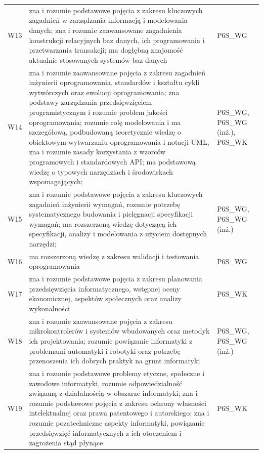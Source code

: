 \documentclass[12pt,a4paper]{article}
\begin{document}
{\begin{longtable}{m{1cm}m{9.5cm}m{3.9cm}}
\rowcolor{tableRowLight} W13 & zna i rozumie podstawowe pojęcia z zakresu kluczowych zagadnień w zarządzania informacją i modelowania danych; zna i rozumie zaawansowane zagadnienia konstrukcji relacyjnych baz danych, ich programowania i przetwarzania transakcji; ma dogłębną znajomość aktualnie stosowanych systemów baz danych & {\scriptsize P6S\_WG} \\
\rowcolor{tableRowAlt} W14 & zna i rozumie zaawansowane pojęcia z zakresu zagadnień inżynierii oprogramowania, standardów i kształtu cykli wytwórczych oraz ewolucji oprogramowania; zna podstawy zarządzania przedsięwzięciem programistycznym i rozumie problem jakości oprogramowania; rozumie rolę modelowania i ma szczegółową, podbudowaną teoretycznie wiedzę o obiektowym  wytwarzaniu oprogramowania i notacji UML, zna i rozumie zasady korzystania z wzorców programowych i standardowych API; ma podstawową wiedzę o typowych narzędziach i środowiskach wspomagających; & {\scriptsize P6S\_WG, P6S\_WG {\scriptsize (inż.)}, P6S\_WK} \\
\rowcolor{tableRowLight} W15 & zna i rozumie podstawowe pojęcia z zakresu kluczowych zagadnień inżynierii wymagań, rozumie potrzebę systematycznego budowania i pielęgnacji specyfikacji wymagań; ma rozszerzoną wiedzę dotyczącą  ich specyfikacji, analizy i modelowania z użyciem dostępnych narzędzi; & {\scriptsize P6S\_WG, P6S\_WG {\scriptsize (inż.)}} \\
\rowcolor{tableRowAlt} W16 & ma rozszerzoną wiedzę z zakresu walidacji i testowania oprogramowania & {\scriptsize P6S\_WG} \\
\rowcolor{tableRowLight} W17 & zna i rozumie podstawowe pojęcia z zakresu planowania przedsięwzięcia informatycznego, wstępnej oceny ekonomicznej, aspektów społecznych oraz analizy wykonalności & {\scriptsize P6S\_WK} \\
\rowcolor{tableRowAlt} W18 & zna i rozumie zaawansowane pojęcia z zakresu mikrokontrolerów i systemów wbudowanych oraz metodyk ich projektowania; rozumie powiązanie informatyki z problemami automatyki i robotyki oraz potrzebę przenoszenia ich dobrych praktyk na grunt informatyki & {\scriptsize P6S\_WG, P6S\_WG {\scriptsize (inż.)}} \\
\rowcolor{tableRowLight} W19 & zna i rozumie podstawowe problemy etyczne, społeczne i zawodowe informatyki, rozumie odpowiedzialność związaną z działalnością w obszarze informatyki; zna i rozumie podstawowe pojęcia z zakresu ochrony własności intelektualnej oraz prawa patentowego i autorskiego; zna i rozumie pozatechniczne aspekty informatyki, powiązanie przedsięwzięć informatycznych z ich otoczeniem i zagrożenia stąd płynące & {\scriptsize P6S\_WK} \\

\end{longtable}}
\end{document}
